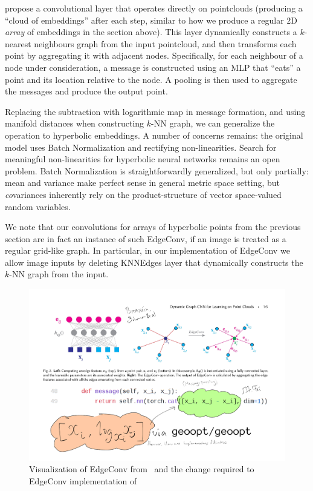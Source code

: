 \citet{edgeconv} propose a convolutional layer that operates directly on
pointclouds (producing a ``cloud of embeddings'' after each step, similar to
how we produce a regular \( 2 \)D \emph{array} of embeddings in the section
above). This layer dynamically constructs a \( k \)-nearest neighbours graph
from the input pointcloud, and then transforms each point by aggregating it
with adjacent nodes. Specifically, for each neighbour of a node under
consideration, a message is constructed using an MLP that ``eats'' a point and its
location relative to the node. A pooling is then used to aggregate the messages
and produce the output point.

Replacing the subtraction with logarithmic map in message formation, and using
manifold distances when constructing \( k \)-NN graph, we can generalize the
operation to hyperbolic embeddings. A number of concerns remains: the original
model uses Batch Normalization and rectifying non-linearities. Search for
meaningful non-linearities for hyperbolic neural networks remains an open
problem. Batch Normalization is straightforwardly generalized, but only
partially: mean and variance make perfect sense in general metric space
setting, but \emph{co}variances inherently rely on the product-structure of
vector space-valued random variables.

We note that our convolutions for arrays of hyperbolic points from the previous
section are in fact an instance of such EdgeConv, if an image is treated as a
regular grid-like graph. In particular, in our implementation of EdgeConv we
allow image inputs by deleting \textrm{KNNEdges} layer that dynamically
constructs the \( k \)-NN graph from the input.

\begin{figure}[H]\center
\includegraphics[width=.75\textwidth]{art/hyperbolic-edgeconv.pdf}
\caption{
    Visualization of EdgeConv from~\citet{edgeconv} and the change
        required to EdgeConv implementation of~\citet{pytorchGeometric}
}
\end{figure}


